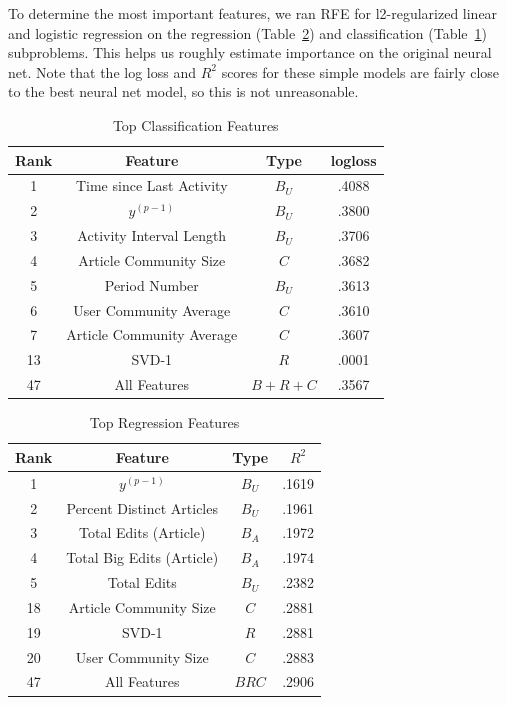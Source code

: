\documentclass[letterpaper, 12pt, conference]{ieeeconf}
\begin{document}
To determine the most important features, we ran RFE for l2-regularized linear and logistic regression on the regression (Table~\ref{tab:top_reg}) and classification (Table~\ref{tab:top_class}) subproblems. This helps us roughly estimate importance on the original neural net. Note that the log loss and $R^2$ scores for these simple models are fairly close to the best neural net model, so this is not unreasonable.
\begin{table}[ht]
    \centering
    \begin{tabular}{c|c|c|c}
        \toprule
        Rank & Feature & Type & logloss \\
         \midrule
        1 & Time since Last Activity & $B_U$ & .4088 \\
        2 & $y^{(p-1)}$ & $B_U$ & .3800 \\
        3 & Activity Interval Length & $B_U$ & .3706  \\
        4 & Article Community Size & $C$ & .3682  \\
        5 & Period Number & $B_U$ & .3613  \\
        6 & User Community Average & $C$ & .3610  \\
        7 & Article Community Average & $C$ & .3607 \\
        13 & SVD-1 & $R$ & .0001 \\
        47 & All Features & $B+R+C$ & .3567 \\
         \bottomrule
    \end{tabular}
    \caption{Top Classification Features}
    \label{tab:top_class}
\end{table}
\begin{table}[ht]
    \centering
    \begin{tabular}{c|c|c|c}
        \toprule
        Rank & Feature & Type & $R^2$  \\
         \midrule
        1 & $y^{(p-1)}$ & $B_U$ & .1619  \\
        2 & Percent Distinct Articles & $B_U$ & .1961 \\
        3 & Total Edits (Article) & $B_A$ & .1972 \\
        4 & Total Big Edits (Article) & $B_A$ & .1974 \\
        5 & Total Edits & $B_U$ & .2382  \\
        18 & Article Community Size & $C$ & .2881 \\
        19 & SVD-1 & $R$ & .2881  \\
        20 & User Community Size & $C$ & .2883  \\
        47 & All Features & $BRC$ & .2906 \\
         \bottomrule
    \end{tabular}
    \caption{Top Regression Features}
    \label{tab:top_reg}
\end{table}
\end{document}
